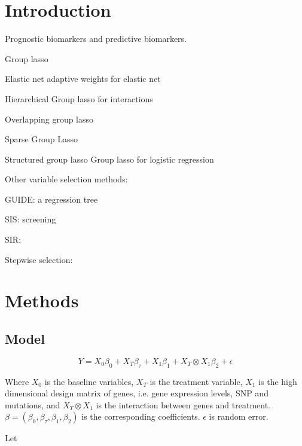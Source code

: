 \documentclass[12pt]{article}
\begin{document}
\section{Introduction}

Prognostic biomarkers and predictive biomarkers.


Group lasso \cite{yuan2006model}

Elastic net \cite{zou2005regularization} adaptive weights for elastic net \cite{zou2009adaptive}

Hierarchical Group lasso for interactions \cite{lim2015learning}

Overlapping group lasso \cite{jacob2009group}\cite{percival2012theoretical}\cite{obozinski2011group}

Sparse Group Lasso \cite{friedman2010note} \cite{simon2013sparse}

Structured group lasso \cite{zhao2009composite}
Group lasso for logistic regression \cite{meier2008group}

Other variable selection methods:

GUIDE: a regression tree \cite{loh2015regression}\cite{loh2002regression}

SIS: screening \cite{fan2008sure}\cite{fan2009ultrahigh}

SIR: \cite{jiang2013sliced}\cite{li2018robust}

Stepwise selection: \cite{miller1984selection}

\section{Methods}

\subsection{Model}

\begin{equation}
Y=X_0\beta_0 + X_T\beta_\tau + X_1\beta_1 + X_T\otimes X_1 \beta_2+\epsilon
\end{equation}

Where $X_0$ is the baseline variables, $X_T$ is the treatment variable, $X_1$ is the high dimensional design matrix of genes, i.e. gene expression levels, SNP and mutations, and $X_T\otimes X_1$ is the interaction between genes and treatment. $\beta=(\beta_0, \beta_\tau, \beta_1, \beta_2)$ is the corresponding coefficients. $\epsilon$ is random error.

Let 
\end{document}
